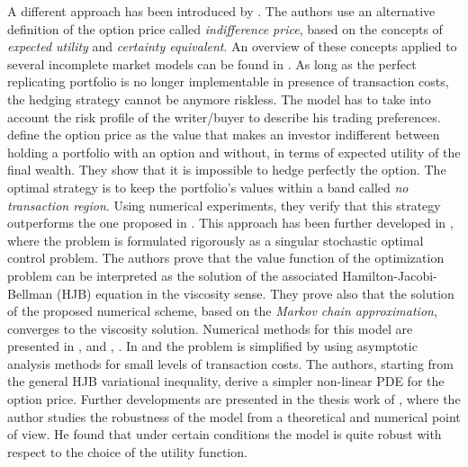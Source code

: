 A different approach has been introduced by \cite{HoNe89}. The authors use an alternative definition of the option price
called \emph{indifference price}, based on the concepts of \emph{expected utility} and \emph{certainty equivalent}.  
An overview of these concepts applied to several incomplete market models can be found in \cite{Carmona}.
As long as the perfect replicating portfolio is no longer implementable in presence of transaction costs, the 
hedging strategy cannot be anymore riskless. 
The model has to take into account the risk profile of the writer/buyer to describe his trading preferences.
\cite{HoNe89} define the option price as the value that makes an investor indifferent between holding a portfolio with an option
and without, in terms of expected utility of the final wealth.
They show that it is impossible to hedge perfectly the option. The optimal strategy is to keep the portfolio's values within
a band called \emph{no transaction region}. Using numerical experiments, they verify that this strategy outperforms the one 
proposed in \cite{Le85}.
This approach has been further developed in \cite{DaPaZa93}, where the problem is formulated rigorously as a singular 
stochastic optimal control problem. The authors prove that the value function of the optimization problem
can be interpreted as the solution of the associated Hamilton-Jacobi-Bellman (HJB) equation in the viscosity sense. 
They prove also that the solution of the proposed numerical scheme, based on the \emph{Markov chain approximation}, converges to the viscosity solution.
Numerical methods for this model are presented in \cite{DaPa94}, \cite{ClHo97} and \cite{Mon03}, \cite{Mon04}.
In \cite{WhWi97} and \cite{BaSo98} the problem is simplified by using asymptotic analysis methods for small levels of 
transaction costs. The authors, starting from the general HJB variational inequality, derive a simpler non-linear PDE for the option price. 
Further developments are presented in the thesis work of \cite{Damgaard}, where the author 
studies the robustness of the model from a theoretical and numerical point of view. 
He found that under certain conditions the model is quite robust with respect to the choice of the utility function. 

